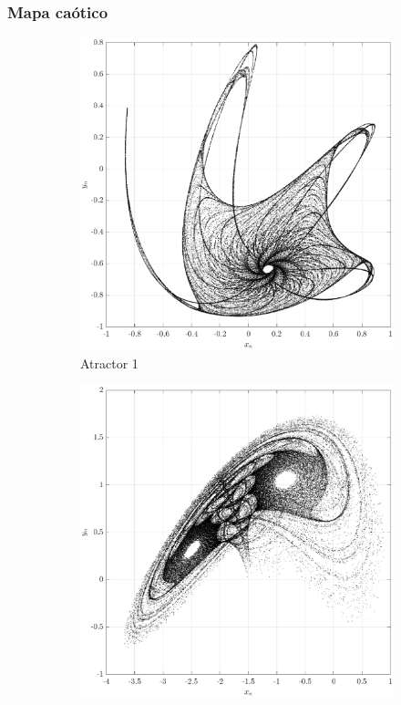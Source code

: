 \documentclass[10pt]{beamer}
\begin{document}
\begin{frame}
    \frametitle{Mapa caótico}
	\begin{figure}[hbtp]
            \centering
            \caption{Diferentes atractores caóticos del mapa bidimensional $A_{1}$ y $A_{2}$.} 
            \begin{subfigure}[b]{0.475\textwidth}
                \centering
                \includegraphics[width=\textwidth,trim=70 0 70 0,clip]{G1_map1}
                \caption{Atractor 1}    
                \label{fig:mapa_1}
            \end{subfigure}
            \hfill
            \begin{subfigure}[b]{0.475\textwidth}  
                \centering 
                \includegraphics[width=\textwidth,trim=70 0 70 0,clip]{G2_map2}

\end{subfigure}
\end{figure}
\end{frame}
\end{document}
